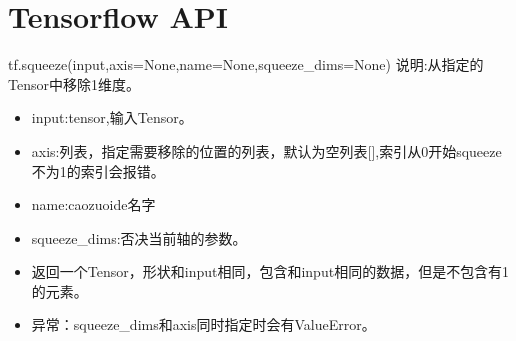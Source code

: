 \chapter{Tensorflow API}
tf.squeeze(input,axis=None,name=None,squeeze_dims=None)
说明:从指定的Tensor中移除1维度。
\begin{itemize}
\item input:tensor,输入Tensor。
\item axis:列表，指定需要移除的位置的列表，默认为空列表[],索引从0开始squeeze不为1的索引会报错。
\item name:caozuoide名字
\item squeeze_dims:否决当前轴的参数。
\item 返回一个Tensor，形状和input相同，包含和input相同的数据，但是不包含有1的元素。
\item 异常：squeeze\_dims和axis同时指定时会有ValueError。
\end{itemize}
